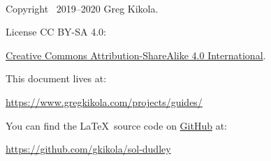 \ \vspace{30mm}

\noindent Copyright \textcopyright\ 2019--2020 Greg Kikola.

\noindent License CC BY-SA 4.0:
\begin{center}
  \href{http://creativecommons.org/licenses/by-sa/4.0/}{Creative Commons
    Attribution-ShareAlike 4.0 International}.
\end{center}
\vspace{30mm}

\noindent This document lives at:
\begin{center}
  \href{https://www.gregkikola.com/projects/guides/}
  {https://www.gregkikola.com/projects/guides/}
\end{center}
You can find the \LaTeX\ source code on
\href{https://github.com/}{GitHub} at:
\begin{center}
  \href{https://github.com/gkikola/sol-dudley}
  {https://github.com/gkikola/sol-dudley}
\end{center}
